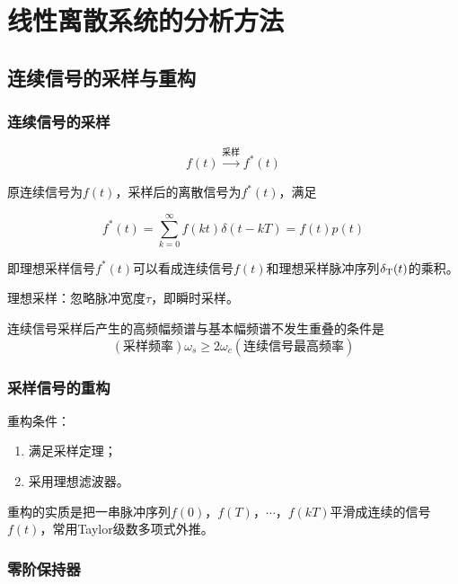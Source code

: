 \section{线性离散系统的分析方法}

\subsection{连续信号的采样与重构}

\subsubsection{连续信号的采样}

\begin{equation*}
    f(t) \xrightarrow{\text{采样}} f^*(t)
\end{equation*}

原连续信号为$f(t)$，采样后的离散信号为$f^*(t)$，满足

\begin{equation}
    f^*(t) = \sum_{k=0}^{\infty} f(kt) \delta(t-kT) = f(t)p(t)
\end{equation}

即理想采样信号$f^*(t)$可以看成连续信号$f(t)$和理想采样脉冲序列$\delta_{\rm T}(t)$的乘积。

理想采样：忽略脉冲宽度$\tau$，即瞬时采样。

\begin{theorem}[采样定理]
    连续信号采样后产生的高频幅频谱与基本幅频谱不发生重叠的条件是
    \begin{equation}
        (\text{采样频率}) \omega_s \geqslant 2 \omega_c (\text{连续信号最高频率})
    \end{equation}
\end{theorem}

\subsubsection{采样信号的重构}

重构条件：
\begin{enumerate}
    \item 满足采样定理；
    \item 采用理想滤波器。
\end{enumerate}
重构的实质是把一串脉冲序列$f(0)$，$f(T)$，$\cdots$，$f(kT)$平滑成连续的信号$f(t)$，常用Taylor级数多项式外推。

\subsubsection{零阶保持器}

